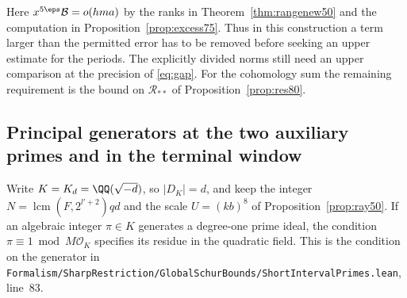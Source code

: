 \documentclass[a4paper,11pt]{article}
\theoremstyle{definition}
\theoremstyle{remark}
\newcommand{\srcloc}[2]{{\small\nolinkurl{#1.lean}}, line~#2}
\numberwithin{equation}{section}
\begin{document}
Here \(x^{5\eps}\mathcal B=o(hma)\) by the ranks in
Theorem~\ref{thm:rangenew50} and the computation in
Proposition~\ref{prop:excess75}. Thus in this construction a
term larger than the permitted error has to be removed before
seeking an upper estimate for the periods. The explicitly divided
norms still need an upper comparison at the precision of
\eqref{eq:gap}. For the cohomology sum the remaining requirement
is the bound on \(\mathcal R_{**}\) of Proposition~\ref{prop:res80}.

\subsection{Principal generators at the two auxiliary primes and in the terminal window}\label{nav:II-26}
Write \(K=K_d=\QQ(\sqrt{-d})\), so \(|D_K|=d\), and keep the
integer \(N=\operatorname{lcm}(F,2^{l'+2})qd\) and the scale
\(U=(kb)^8\) of Proposition~\ref{prop:ray50}. If an algebraic
integer \(\pi\in K\) generates a degree-one prime ideal, the
condition \(\pi\equiv1\bmod M\mathcal O_K\) specifies its residue in
the quadratic field. This is the condition on the generator in
\srcloc{Formalism/SharpRestriction/GlobalSchurBounds/ShortIntervalPrimes}{83}.
\end{document}
